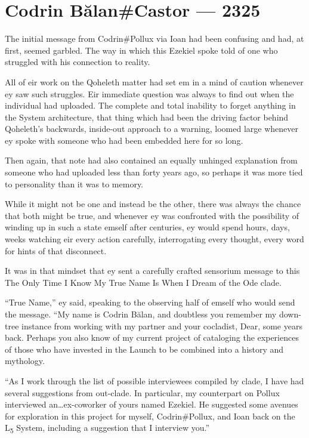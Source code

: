 \hypertarget{codrin-bux103lancastor-2325}{%
\chapter{Codrin Bălan\#Castor — 2325}\label{codrin-bux103lancastor-2325}}

The initial message from Codrin\#Pollux via Ioan had been confusing and had, at first, seemed garbled. The way in which this Ezekiel spoke told of one who struggled with his connection to reality.

All of eir work on the Qoheleth matter had set em in a mind of caution whenever ey saw such struggles. Eir immediate question was always to find out when the individual had uploaded. The complete and total inability to forget anything in the System architecture, that thing which had been the driving factor behind Qoheleth's backwards, inside-out approach to a warning, loomed large whenever ey spoke with someone who had been embedded here for so long.

Then again, that note had also contained an equally unhinged explanation from someone who had uploaded less than forty years ago, so perhaps it was more tied to personality than it was to memory.

While it might not be one and instead be the other, there was always the chance that both might be true, and whenever ey was confronted with the possibility of winding up in such a state emself after centuries, ey would spend hours, days, weeks watching eir every action carefully, interrogating every thought, every word for hints of that disconnect.

It was in that mindset that ey sent a carefully crafted sensorium message to this The Only Time I Know My True Name Is When I Dream of the Ode clade.

``True Name,'' ey said, speaking to the observing half of emself who would send the message. ``My name is Codrin Bălan, and doubtless you remember my down-tree instance from working with my partner and your cocladist, Dear, some years back. Perhaps you also know of my current project of cataloging the experiences of those who have invested in the Launch to be combined into a history and mythology.

``As I work through the list of possible interviewees compiled by clade, I have had several suggestions from out-clade. In particular, my counterpart on Pollux interviewed an\ldots ex-coworker of yours named Ezekiel. He suggested some avenues for exploration in this project for myself, Codrin\#Pollux, and Ioan back on the L\textsubscript{5} System, including a suggestion that I interview you.''

